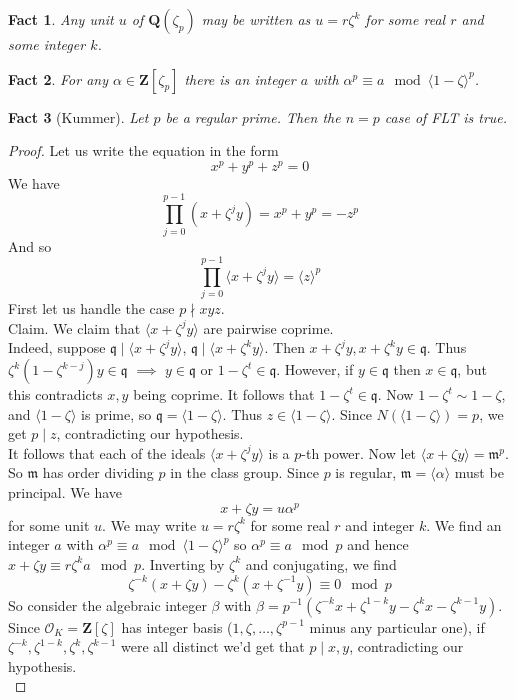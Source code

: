 \documentclass[12pt]{article}
\newtheorem*{fact*}{Fact}
\newcommand{\gen}[1]{\langle#1\rangle}
\newcommand{\m}{\mathfrak{m}}
\newcommand{\q}{\mathfrak{q}}
\newcommand{\Q}{\mathbf{Q}}
\newcommand{\Z}{\mathbf{Z}}
\newcommand{\OO}{\mathcal{O}}
\begin{document}
\begin{fact*}
Any unit $u$ of $\Q(\zeta_p)$ may be written as $u=r\zeta^k$ for some real $r$ and some integer $k$.
\end{fact*}


\begin{fact*}
For any $\alpha\in\Z[\zeta_p]$ there is an integer $a$ with $\alpha^p \equiv a \mod \gen{1-\zeta}^p$. 
\end{fact*}


\begin{fact*}[Kummer]
Let $p$ be a regular prime. Then the $n=p$ case of FLT is true.
\end{fact*}


\begin{proof}
Let us write the equation in the form \[x^p+y^p+z^p=0\]
We have 
\[\prod_{j=0}^{p-1}(x+\zeta^j y) = x^p + y^p = -z^p\]
And so 
\[\prod_{j=0}^{p-1}\gen{x+\zeta^j y} = \gen{z}^p\]
First let us handle the case $p\nmid xyz$. \\
Claim. We claim that $\gen{x+\zeta^j y}$ are pairwise coprime. \\
Indeed, suppose $\q \mid \gen{x+\zeta^j y}$, $\q \mid \gen{x+\zeta^k y}$. Then $x+\zeta^j y, x+\zeta^k y\in \q$. Thus $ \zeta^k(1-\zeta^{k-j})y\in\q$ $\implies$ $y\in\q$ or $1-\zeta^t \in \q$. However, if $y\in\q$ then $x\in\q$, but this contradicts $x,y$ being coprime. It follows that $1-\zeta^t \in\q$. Now $1-\zeta^t \sim 1-\zeta$, and $\gen{1-\zeta}$ is prime, so $\q = \gen{1-\zeta}$. Thus $z\in\gen{1-\zeta}$. Since $N(\gen{1-\zeta})=p$, we get $p\mid z$, contradicting our hypothesis. \\
It follows that each of the ideals $\gen{x+\zeta^j y}$ is a $p$-th power. Now let $\gen{x+\zeta y} = \m^p$. So $\m$ has order dividing $p$ in the class group. Since $p$ is regular, $\m=\gen{\alpha}$ must be principal. We have \[x+\zeta y = u\alpha^p\]
for some unit $u$. We may write $u=r\zeta^k$ for some real $r$ and integer $k$. We find an integer $a$ with $\alpha^p\equiv a\mod \gen{1-\zeta}^p$ so $\alpha^p \equiv a\mod p$ and hence $x+\zeta y \equiv r\zeta^k a \mod p$. Inverting by $\zeta^k$ and conjugating, we find
\[\zeta^{-k}(x+\zeta y) - \zeta^{k}(x+\zeta^{-1} y) \equiv 0 \mod p\]
So consider the algebraic integer $\beta$ with 
$\beta = p^{-1}\left(\zeta^{-k}x + \zeta^{1-k}y - \zeta^{k}x - \zeta^{k-1}y\right)$. Since $\OO_K = \Z[\zeta]$ has integer basis ($1,\zeta,\dots,\zeta^{p-1}$ minus any particular one), if $\zeta^{-k},\zeta^{1-k},\zeta^{k},\zeta^{k-1}$ were all distinct we'd get that $p\mid x,y$, contradicting our hypothesis. \\

\end{proof}
\end{document}
